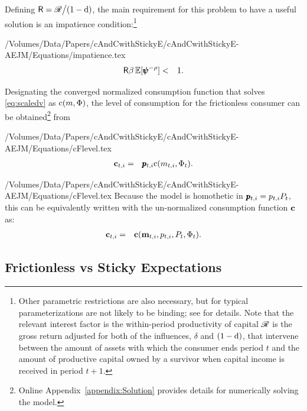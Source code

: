 Defining $\mathsf{R} = \mathscr{R}\big/(1-\mathrm{d})$, the main requirement for this problem to have a useful solution is an impatience condition:\footnote{Other parametric restrictions are also necessary, but for typical parameterizations are not likely to be binding; see \cite{BufferStockTheory} for details.  Note that the relevant interest factor is the within-period productivity of capital $\mathscr{R}$ is the gross return adjusted for both of the influences, $\delta$ and $(1-\mathrm{d})$, that intervene between the amount of assets with which the consumer ends period $t$ and the amount of productive capital owned by a survivor when capital income is received in period $t+1$.  }
\begin{verbatimwrite}{/Volumes/Data/Papers/cAndCwithStickyE/cAndCwithStickyE-AEJM/Equations/impatience.tex}
\begin{eqnarray*}
  \label{eq:impatience}
  \mathsf{R} \beta  \operatorname{\mathbb{E}}[ \pmb{\psi}^{-\rho}]  & < & 1.
\end{eqnarray*}
\end{verbatimwrite}


Designating the converged normalized consumption function that solves \eqref{eq:scaledv} as
$\mathrm{c}(m,\Phi)$, the level of consumption for the frictionless consumer can be obtained\footnote{Online Appendix~\ref{appendix:Solution}
provides details for numerically solving the model.} from
\begin{verbatimwrite}{/Volumes/Data/Papers/cAndCwithStickyE/cAndCwithStickyE-AEJM/Equations/cFlevel.tex}
\begin{eqnarray}
  \label{eq:cFlevel}
   \mathbf{c}_{t,i} & = & \pmb{p}_{t,i} \mathrm{c}(m_{t,i},\Phi_t)  \nonumber
.
\end{eqnarray}
\end{verbatimwrite}
 {/Volumes/Data/Papers/cAndCwithStickyE/cAndCwithStickyE-AEJM/Equations/cFlevel.tex}
Because the model is homothetic in $\pmb{p}_{t,i}={p}_{t,i} {P}_{t}$, this can be equivalently written with the un-normalized consumption function $\textbf{c}$ as:
\begin{eqnarray*}
\mathbf{c}_{t,i} & = & \textbf{c}(\mathbf{m}_{t,i}, p_{t,i}, {P}_t, {\Phi}_t).
\end{eqnarray*}


\subsection{Frictionless vs Sticky Expectations}\label{sec:StickySOE}

